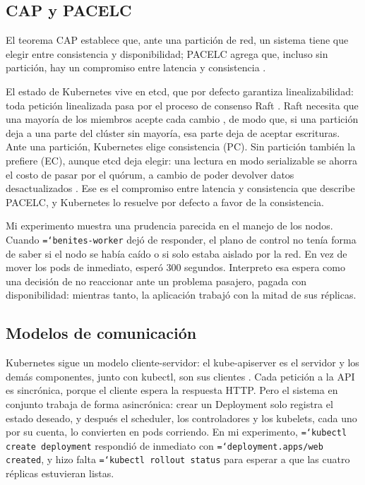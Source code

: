 \documentclass[11pt,a4paper]{article}
\newcommand{\cmd}[1]{\texttt{\hyphenchar\font=`\-\relax #1}}
\begin{document}
\subsection{CAP y PACELC}

El teorema CAP establece que, ante una partición de red, un sistema tiene que elegir entre consistencia y disponibilidad; PACELC agrega que, incluso sin partición, hay un compromiso entre latencia y consistencia \cite{abadi2012}.

El estado de Kubernetes vive en etcd, que por defecto garantiza linealizabilidad: toda petición linealizada pasa por el proceso de consenso Raft \cite{etcd_api}. Raft necesita que una mayoría de los miembros acepte cada cambio \cite{swarm_raft}, de modo que, si una partición deja a una parte del clúster sin mayoría, esa parte deja de aceptar escrituras. Ante una partición, Kubernetes elige consistencia (PC). Sin partición también la prefiere (EC), aunque etcd deja elegir: una lectura en modo serializable se ahorra el costo de pasar por el quórum, a cambio de poder devolver datos desactualizados \cite{etcd_api}. Ese es el compromiso entre latencia y consistencia que describe PACELC, y Kubernetes lo resuelve por defecto a favor de la consistencia.

Mi experimento muestra una prudencia parecida en el manejo de los nodos. Cuando \cmd{benites-worker} dejó de responder, el plano de control no tenía forma de saber si el nodo se había caído o si solo estaba aislado por la red. En vez de mover los pods de inmediato, esperó 300 segundos. Interpreto esa espera como una decisión de no reaccionar ante un problema pasajero, pagada con disponibilidad: mientras tanto, la aplicación trabajó con la mitad de sus réplicas.

\subsection{Modelos de comunicación}

Kubernetes sigue un modelo cliente-servidor: el kube-apiserver es el servidor y los demás componentes, junto con kubectl, son sus clientes \cite{k8s_components}. Cada petición a la API es sincrónica, porque el cliente espera la respuesta HTTP. Pero el sistema en conjunto trabaja de forma asincrónica: crear un Deployment solo registra el estado deseado, y después el scheduler, los controladores y los kubelets, cada uno por su cuenta, lo convierten en pods corriendo. En mi experimento, \cmd{kubectl create deployment} respondió de inmediato con \cmd{deployment.apps/web created}, y hizo falta \cmd{kubectl rollout status} para esperar a que las cuatro réplicas estuvieran listas.
\end{document}

